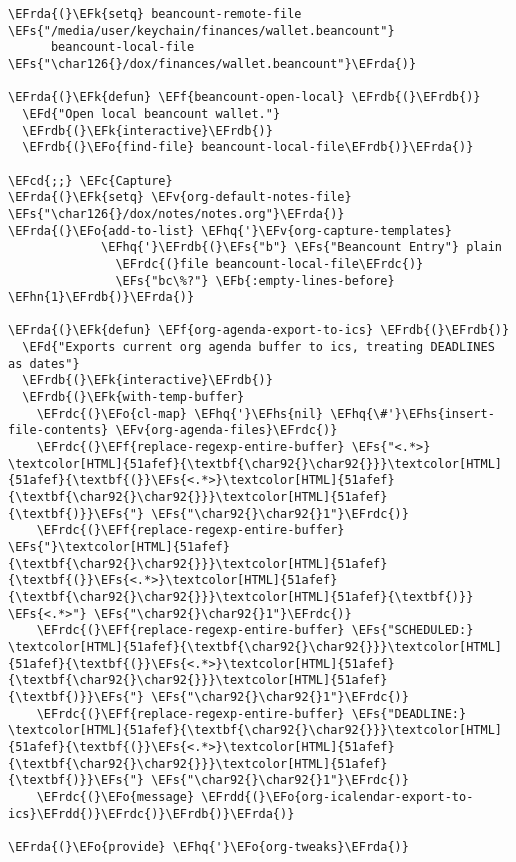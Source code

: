 \documentclass[a4wide,10pt]{article}
\newcommand{\EFc}[1]{\textcolor{EFc}{#1}} %
\newcommand{\EFcd}[1]{\textcolor{EFcd}{#1}} %
\newcommand{\EFs}[1]{\textcolor{EFs}{#1}} %
\newcommand{\EFd}[1]{\textcolor{EFd}{#1}} %
\newcommand{\EFk}[1]{\textcolor{EFk}{#1}} %
\newcommand{\EFb}[1]{\textcolor{EFb}{#1}} %
\newcommand{\EFf}[1]{\textcolor{EFf}{#1}} %
\newcommand{\EFv}[1]{\textcolor{EFv}{#1}} %
\newcommand{\EFo}[1]{\textcolor{EFo}{#1}} %
\newcommand{\EFhn}[1]{\textcolor{EFhn}{\textbf{#1}}} %
\newcommand{\EFhq}[1]{\textcolor{EFhq}{#1}} %
\newcommand{\EFhs}[1]{\textcolor{EFhs}{#1}} %
\newcommand{\EFrda}[1]{\textcolor{EFrda}{#1}} %
\newcommand{\EFrdb}[1]{\textcolor{EFrdb}{#1}} %
\newcommand{\EFrdc}[1]{\textcolor{EFrdc}{#1}} %
\newcommand{\EFrdd}[1]{\textcolor{EFrdd}{#1}} %
\begin{document}
\begin{Code}
\begin{Verbatim}
\EFrda{(}\EFk{setq} beancount-remote-file \EFs{"/media/user/keychain/finances/wallet.beancount"}
      beancount-local-file \EFs{"\char126{}/dox/finances/wallet.beancount"}\EFrda{)}

\EFrda{(}\EFk{defun} \EFf{beancount-open-local} \EFrdb{(}\EFrdb{)}
  \EFd{"Open local beancount wallet."}
  \EFrdb{(}\EFk{interactive}\EFrdb{)}
  \EFrdb{(}\EFo{find-file} beancount-local-file\EFrdb{)}\EFrda{)}

\EFcd{;;} \EFc{Capture}
\EFrda{(}\EFk{setq} \EFv{org-default-notes-file} \EFs{"\char126{}/dox/notes/notes.org"}\EFrda{)}
\EFrda{(}\EFo{add-to-list} \EFhq{'}\EFv{org-capture-templates}
             \EFhq{'}\EFrdb{(}\EFs{"b"} \EFs{"Beancount Entry"} plain
               \EFrdc{(}file beancount-local-file\EFrdc{)}
               \EFs{"bc\%?"} \EFb{:empty-lines-before} \EFhn{1}\EFrdb{)}\EFrda{)}

\EFrda{(}\EFk{defun} \EFf{org-agenda-export-to-ics} \EFrdb{(}\EFrdb{)}
  \EFd{"Exports current org agenda buffer to ics, treating DEADLINES as dates"}
  \EFrdb{(}\EFk{interactive}\EFrdb{)}
  \EFrdb{(}\EFk{with-temp-buffer}
    \EFrdc{(}\EFo{cl-map} \EFhq{'}\EFhs{nil} \EFhq{\#'}\EFhs{insert-file-contents} \EFv{org-agenda-files}\EFrdc{)}
    \EFrdc{(}\EFf{replace-regexp-entire-buffer} \EFs{"<.*>} \textcolor[HTML]{51afef}{\textbf{\char92{}\char92{}}}\textcolor[HTML]{51afef}{\textbf{(}}\EFs{<.*>}\textcolor[HTML]{51afef}{\textbf{\char92{}\char92{}}}\textcolor[HTML]{51afef}{\textbf{)}}\EFs{"} \EFs{"\char92{}\char92{}1"}\EFrdc{)}
    \EFrdc{(}\EFf{replace-regexp-entire-buffer} \EFs{"}\textcolor[HTML]{51afef}{\textbf{\char92{}\char92{}}}\textcolor[HTML]{51afef}{\textbf{(}}\EFs{<.*>}\textcolor[HTML]{51afef}{\textbf{\char92{}\char92{}}}\textcolor[HTML]{51afef}{\textbf{)}} \EFs{<.*>"} \EFs{"\char92{}\char92{}1"}\EFrdc{)}
    \EFrdc{(}\EFf{replace-regexp-entire-buffer} \EFs{"SCHEDULED:} \textcolor[HTML]{51afef}{\textbf{\char92{}\char92{}}}\textcolor[HTML]{51afef}{\textbf{(}}\EFs{<.*>}\textcolor[HTML]{51afef}{\textbf{\char92{}\char92{}}}\textcolor[HTML]{51afef}{\textbf{)}}\EFs{"} \EFs{"\char92{}\char92{}1"}\EFrdc{)}
    \EFrdc{(}\EFf{replace-regexp-entire-buffer} \EFs{"DEADLINE:} \textcolor[HTML]{51afef}{\textbf{\char92{}\char92{}}}\textcolor[HTML]{51afef}{\textbf{(}}\EFs{<.*>}\textcolor[HTML]{51afef}{\textbf{\char92{}\char92{}}}\textcolor[HTML]{51afef}{\textbf{)}}\EFs{"} \EFs{"\char92{}\char92{}1"}\EFrdc{)}
    \EFrdc{(}\EFo{message} \EFrdd{(}\EFo{org-icalendar-export-to-ics}\EFrdd{)}\EFrdc{)}\EFrdb{)}\EFrda{)}

\EFrda{(}\EFo{provide} \EFhq{'}\EFo{org-tweaks}\EFrda{)}
\end{Verbatim}
\end{Code}
\end{document}
